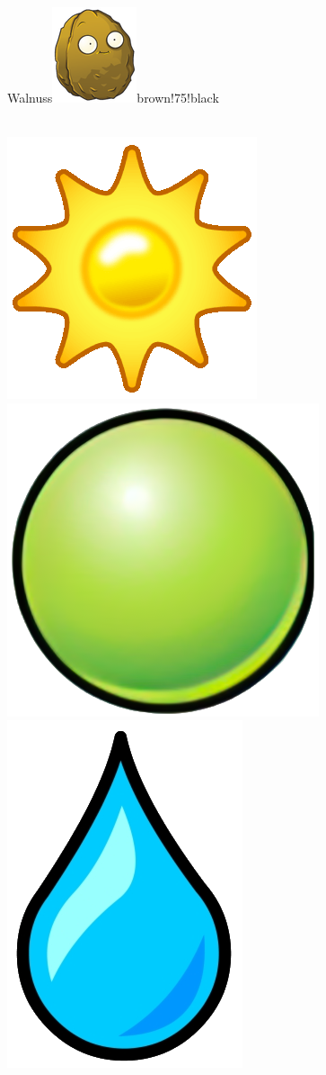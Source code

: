 \documentclass[11pt, a5paper]{article}
\def\now{\hspace{0.2cm}}
\begin{document}
	\begin{mybox}{Walnuss}{\includegraphics[scale=0.25]{walnut}}{brown!75!black}
		\phantom{My}\\ \\
		\tcblower
		\begin{minipage}[t]{\textwidth}
			\vspace*{-1.2cm}
			\now\includegraphics[scale=0.1]{sun} 
			\now\includegraphics[scale=0.075]{peap} 
			\now\includegraphics[scale=0.3]{water} 

\end{minipage}
\end{mybox}
\end{document}
